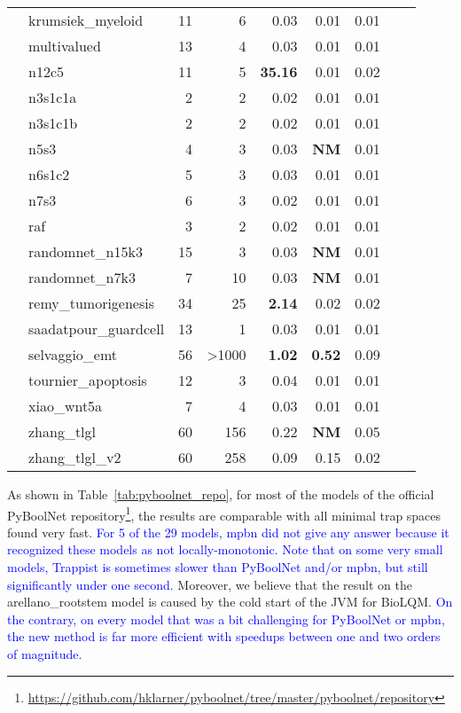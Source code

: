 \documentclass[runningheads]{llncs}
\newcounter{rownumber}
\newcommand\rownb{\stepcounter{rownumber}\arabic{rownumber}}
\newcommand{\revise}[1]{\textcolor{blue}{#1}}
\begin{document}
\begin{table}[!htb]
\begin{tabular}{rlrrrrrrr}
    \rownb & krumsiek\_myeloid & 11 & 6 & 0.03 & 0.01 & 0.01\\
    \rownb & multivalued & 13 & 4 & 0.03 & 0.01 & 0.01\\
    \rownb & n12c5 & 11 & 5 & \textbf{35.16} & 0.01 & 0.02\\
    \rownb & n3s1c1a & 2 & 2 & 0.02 & 0.01 & 0.01\\
    \rownb & n3s1c1b & 2 & 2 & 0.02 & 0.01 & 0.01\\
    \rownb & n5s3 & 4 & 3 & 0.03 & \textbf{NM} & 0.01\\
    \rownb & n6s1c2 & 5 & 3 & 0.03 & 0.01 & 0.01\\
    \rownb & n7s3 & 6 & 3 & 0.02 & 0.01 & 0.01\\
    \rownb & raf & 3 & 2 & 0.02 & 0.01 & 0.01\\
    \rownb & randomnet\_n15k3 & 15 & 3 & 0.03 & \textbf{NM} & 0.01\\
    \rownb & randomnet\_n7k3 & 7 & 10 & 0.03 & \textbf{NM} & 0.01\\
    \rownb & remy\_tumorigenesis & 34 & 25 & \textbf{2.14} & 0.02 & 0.02\\
    \rownb & saadatpour\_guardcell & 13 & 1 & 0.03 & 0.01 & 0.01\\
    \rownb & selvaggio\_emt & 56 & >1000 & \textbf{1.02} & \textbf{0.52} & 0.09\\
    \rownb & tournier\_apoptosis & 12 & 3 & 0.04 & 0.01 & 0.01\\
    \rownb & xiao\_wnt5a & 7 & 4 & 0.03 & 0.01 & 0.01\\
    \rownb & zhang\_tlgl & 60 & 156 & 0.22 & \textbf{NM} & 0.05\\
    \rownb & zhang\_tlgl\_v2 & 60 & 258 & 0.09 & 0.15 & 0.02\\
    \bottomrule
  \end{tabular}
\end{table}
\setcounter{rownumber}{0}

As shown in Table~\ref{tab:pyboolnet_repo}, for most of the models of the official PyBoolNet repository\footnote{\url{https://github.com/hklarner/pyboolnet/tree/master/pyboolnet/repository}}, the results are comparable with all minimal trap spaces found very fast.
\revise{For 5 of the 29 models, mpbn did not give any answer because it recognized these models as not locally-monotonic.
Note that on some very small models, Trappist is sometimes slower than PyBoolNet and/or mpbn, but still significantly under one second.}
Moreover, we believe that the result on the arellano\_rootstem model is caused by the cold start of the JVM for BioLQM.\@
\revise{On the contrary, on every model that was a bit challenging for PyBoolNet or mpbn, the new method is far more efficient with speedups between one and two orders of magnitude.}
\end{document}
